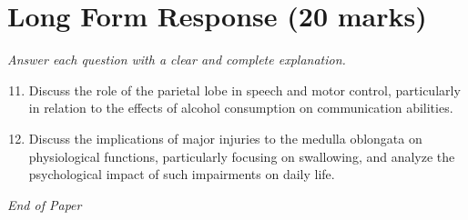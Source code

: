 \documentclass[12pt]{article}
\begin{document}
\section*{Long Form Response (20 marks)}
\textit{Answer each question with a clear and complete explanation.}
\begin{enumerate}[label=\arabic*.]
\setcounter{enumi}{10}
\item Discuss the role of the parietal lobe in speech and motor control, particularly in relation to the effects of alcohol consumption on communication abilities.
\item Discuss the implications of major injuries to the medulla oblongata on physiological functions, particularly focusing on swallowing, and analyze the psychological impact of such impairments on daily life.
\end{enumerate}

\vfill
\noindent\textit{End of Paper}
\end{document}
